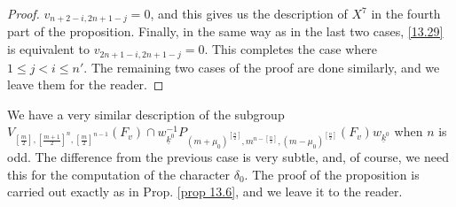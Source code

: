 \documentclass[12pts]{amsart}
\begin{document}
\begin{proof}
$v_{n+2-i,2n+1-j}=0$, and this gives us the description of $X^7$ in the fourth part of the proposition. Finally, in the same way as in the last two cases, \eqref{13.29} is equivalent to $v_{2n+1-i,2n+1-j}=0$. This completes the case where $1\leq j<i\leq n'$. The remaining two cases of the proof are done similarly, and we leave them for the reader.	
	
\end{proof}

We have a very similar description of the subgroup $V_{[\frac{m}{2}],[\frac{m+1}{2}]^n,[\frac{m}{2}]^{n-1}}(F_v)\cap w^{-1}_{\underline{k}^0}P_{(m+\mu_0)^{[\frac{n}{2}]},m^{n-[\frac{n}{2}]}, (m-\mu_0)^{[\frac{n}{2}]}}(F_v)w_{\underline{k}^0}$ when $n$ is odd. The difference from the previous case is very subtle, and, of course, we need this for the computation of the character $\delta_0$. The proof of the proposition is carried out exactly as in Prop. \ref{prop 13.6}, and we leave it to the reader.
\end{document}

